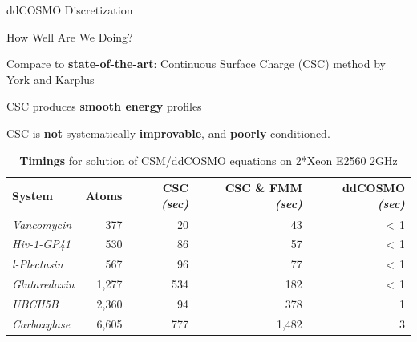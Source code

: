\begin{frame}{ddCOSMO Discretization}
\end{frame}

\begin{frame}{How Well Are We Doing?}

\begin{wideitemize}
\item Compare to {\bf state-of-the-art}: Continuous Surface Charge (CSC) method by York and Karplus
\item CSC produces {\bf smooth energy} profiles
\item CSC is {\bf not} systematically {\bf improvable}, and {\bf poorly} conditioned.
\end{wideitemize}

\vfill

\pause

{\footnotesize
\begin{center}
\begin{table}
	\begin{tabular}{ lrrrr  }
\toprule[0.1em] 
{\bf System}	& {\bf Atoms}	& {\bf CSC} {\sl(sec)} & {\bf CSC \& FMM} {\sl(sec)} & {\bf ddCOSMO} {\sl(sec)} \\
\midrule[0.08em]
{\sl Vancomycin}	& 377	& 20  	& 43 		&  \cellcolor{YellowGreen} $<\,$1 \\
{\sl Hiv-1-GP41} 	& 530	& 86		& 57 		& \cellcolor{YellowGreen}$<\,$1 \\
{\sl l-Plectasin} 		& 567	& 96		& 77		& \cellcolor{YellowGreen}$<\,$1 \\
{\sl Glutaredoxin} 	& 1,277 	& 534 	& 182 	& \cellcolor{YellowGreen}$<\,$1 \\
{\sl UBCH5B}		& 2,360 	& 94		& 378 	& \cellcolor{YellowGreen}1 \\
{\sl Carboxylase} 	& 6,605	& 777 	& 1,482	& \cellcolor{YellowGreen}3 \\
\bottomrule[0.1em]
	\end{tabular}
		\caption{{\bf Timings} for solution of CSM/ddCOSMO equations on 2*Xeon E2560 2GHz}
		\end{table}
\end{center}
}

\end{frame}



